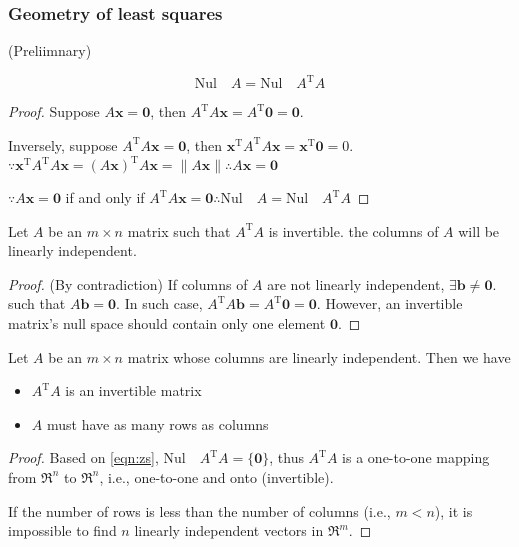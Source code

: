\subsubsection{Geometry of least squares}
(Preliimnary)
\begin{conclusion}
\begin{equation}
\text{Nul}\quad{}A=\text{Nul}\quad{}A^{\mathrm{T}}A
\label{eqn:zs}
\end{equation}
\end{conclusion}
\begin{proof}
Suppose $A\mathbf{x}=\mathbf{0}$, then $A^{\mathrm{T}}A\mathbf{x}=A^{\mathrm{T}}\mathbf{0}=\mathbf{0}$.


Inversely, suppose $A^{\mathrm{T}}A\mathbf{x}=\mathbf{0}$, then $\mathbf{x}^{\mathrm{T}}A^{\mathrm{T}}A\mathbf{x}=\mathbf{x}^{\mathrm{T}}\mathbf{0}=0$. $\because{}\mathbf{x}^{\mathrm{T}}A^{\mathrm{T}}A\mathbf{x}=(A\mathbf{x})^{\mathrm{T}}A\mathbf{x}=\|A\mathbf{x}\|\therefore{}A\mathbf{x}=\mathbf{0}$


$\because{}A\mathbf{x}=\mathbf{0}$ if and only if $A^{\mathrm{T}}A\mathbf{x}=\mathbf{0}\therefore{}\text{Nul}\quad{}A=\text{Nul}\quad{}A^{\mathrm{T}}A$
\end{proof}


\begin{conclusion}
Let $A$ be an $m\times{}n$ matrix such that $A^{\mathrm{T}}A$ is invertible. the columns of $A$ will be linearly independent.
\end{conclusion}
\begin{proof}
(By contradiction) If columns of $A$ are not linearly independent, $\exists\mathbf{b}\neq\mathbf{0}$. such that $A\mathbf{b}=\mathbf{0}$.  In such case, $A^{\mathrm{T}}A\mathbf{b}=A^{\mathrm{T}}\mathbf{0}=\mathbf{0}$. However, an invertible matrix's null space should contain only one element $\mathbf{0}$.
\end{proof}


\begin{conclusion}
Let $A$ be an $m\times{}n$ matrix whose columns are linearly independent. Then we have
\begin{itemize}
\item $A^{\mathrm{T}}A$ is an invertible matrix
\item $A$ must have as many rows as columns
\end{itemize}
\end{conclusion}
\begin{proof}
Based on \eqref{eqn:zs}, $\text{Nul}\quad{}A^{\mathrm{T}}A=\{\mathbf{0}\}$, thus $A^{\mathrm{T}}A$ is a one-to-one mapping from $\Re^{n}$ to $\Re^{n}$, i.e., one-to-one and onto (invertible).

If the number of rows is less than the number of columns (i.e., $m<n$), it is impossible to find $n$ linearly independent vectors in $\Re^{m}$.
\end{proof}


